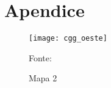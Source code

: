 \chapter{Apendice}
\label{apendicecggigg}
\blindtext

\begin{figure}[H]
	\centering
	\texttt{[image: cgg\_oeste]}
	\caption{Mapa 2} 
	Fonte: 
	\label{fig:mapacgg2}
\end{figure}	

\newpage
